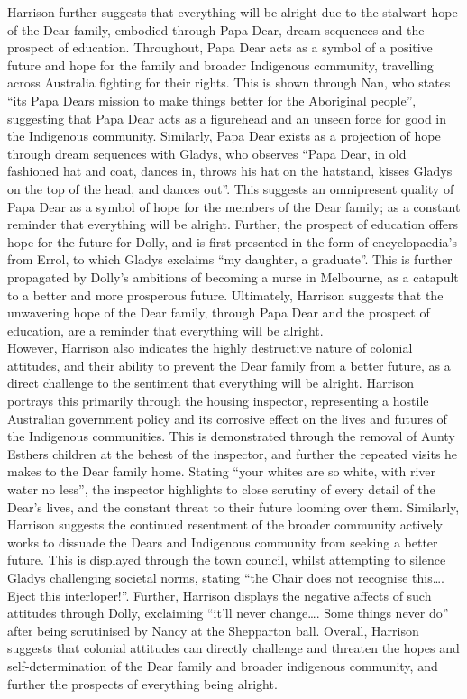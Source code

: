 \documentclass[a4paper]{article}
\begin{document}
Harrison further suggests that everything will be alright due to the stalwart hope of the Dear family,
embodied through Papa Dear, dream sequences and the prospect of education. Throughout, Papa
Dear acts as a symbol of a positive future and hope for the family and broader Indigenous
community, travelling across Australia fighting for their rights. This is shown through Nan, who states
“its Papa Dears mission to make things better for the Aboriginal people”, suggesting that Papa Dear
acts as a figurehead and an unseen force for good in the Indigenous community. Similarly, Papa Dear
exists as a projection of hope through dream sequences with Gladys, who observes “Papa Dear, in
old fashioned hat and coat, dances in, throws his hat on the hatstand, kisses Gladys on the top of the
head, and dances out”. This suggests an omnipresent quality of Papa Dear as a symbol of hope for
the members of the Dear family; as a constant reminder that everything will be alright. Further, the
prospect of education offers hope for the future for Dolly, and is first presented in the form of
encyclopaedia’s from Errol, to which Gladys exclaims “my daughter, a graduate”. This is further
propagated by Dolly’s ambitions of becoming a nurse in Melbourne, as a catapult to a better and
more prosperous future. Ultimately, Harrison suggests that the unwavering hope of the Dear family,
through Papa Dear and the prospect of education, are a reminder that everything will be alright.\\

However, Harrison also indicates the highly destructive nature of colonial attitudes, and their ability
to prevent the Dear family from a better future, as a direct challenge to the sentiment that
everything will be alright. Harrison portrays this primarily through the housing inspector,
representing a hostile Australian government policy and its corrosive effect on the lives and futures
of the Indigenous communities. This is demonstrated through the removal of Aunty Esthers children
at the behest of the inspector, and further the repeated visits he makes to the Dear family home.
Stating “your whites are so white, with river water no less”, the inspector highlights to close scrutiny
of every detail of the Dear’s lives, and the constant threat to their future looming over them.
Similarly, Harrison suggests the continued resentment of the broader community actively works to
dissuade the Dears and Indigenous community from seeking a better future. This is displayed
through the town council, whilst attempting to silence Gladys challenging societal norms, stating
“the Chair does not recognise this…. Eject this interloper!”. Further, Harrison displays the negative
affects of such attitudes through Dolly, exclaiming “it’ll never change…. Some things never do” after
being scrutinised by Nancy at the Shepparton ball. Overall, Harrison suggests that colonial attitudes
can directly challenge and threaten the hopes and self-determination of the Dear family and broader
indigenous community, and further the prospects of everything being alright.\\
\end{document}
